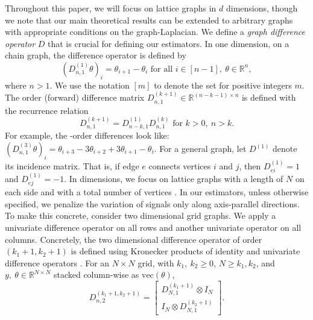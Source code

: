 \documentclass[ejs,noshowframe]{imsart}
\theoremstyle{plain}
\theoremstyle{definition}
\newcommand{\R}{\mathbb{R}}
\begin{document}
Throughout this paper, we will focus on lattice graphs in $d$ dimensions, though
we note that our main theoretical results can be extended to arbitrary graphs
with appropriate conditions on the graph-Laplacian. We define a 
 {\em graph difference operator}  $D$ that is crucial for 
defining our estimators. In one dimension, on a chain graph, 
the difference operator  is defined by 
\begin{equation}
  (D_{n, 1}^{(1)} \theta)_i = \theta_{i+1} - \theta_{i} \text{ for all }
  i\in [n-1],\ \theta \in \R^n, 
\end{equation}
where $n>1.$ We use the notation $[m]$ to denote the set 
 for positive integers $m$.
The  order (forward) difference matrix 
$D_{n,1}^{(k+1)} \in \R^{(n-k-1)\times n}$
is defined with the recurrence relation
\begin{equation}
  D_{n, 1}^{(k+1)} = D_{n-k, 1}^{(1)} D_{n, 1}^{(k)} \text{ for } k>0,\ n>k.
\end{equation}
For example, the 
-order differences look like:
$(D_{n,1}^{(3)}\theta)_i = \theta_{i+3} -
  3\theta_{i+2}+3\theta_{i+1}-\theta_i.$
For a general graph, let $D^{(1)}$ denote its incidence matrix. That is, 
if edge $e$ connects vertices $i$ and $j$, then $D^{(1)}_{ei} = 1$ and
$D^{(1)}_{ej} = -1$. 
In  dimensions, we focus on lattice graphs with a length of $N$ on 
each 
side and with a total number of vertices .
In our estimators, unless otherwise specified, we penalize the variation of 
signals only along axis-parallel directions. 
To make this concrete, consider two dimensional grid graphs. We apply a univariate difference operator 
 on all rows and another univariate operator 
 on all columns.
Concretely, the two dimensional difference operator of order $(k_1 +1, k_2 +1)$
is defined using Kronecker products of identity and 
univariate difference operators 
. 
For an $N \times N$ grid, with $k_1,\ k_2 \ge 0$,
$N\ge k_1, k_2$, and $y,\ \theta \in \R^{N\times N}$ stacked column-wise
as $\textrm{vec}(\theta)$, 
\begin{equation}
  D_{n, 2}^{(k_1+1, k_2+1)} =
    \begin{bmatrix}
      D_{N, 1}^{(k_1+1)} \otimes I_{N} \\ 
      I_{N} \otimes D_{N, 1}^{(k_2+1)} 
    \end{bmatrix}.
\end{equation}
\end{document}
